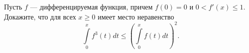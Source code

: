 \documentclass{article}
\begin{document}
Пусть $f$ --- дифференцируемая функция, причем $f(0)=0$ и $0 < f'(x) \leqslant 1$. Докажите, что для всех $x \geqslant 0$ имеет место неравенство
$$\int\limits_0^x f^3 (t) dt \leqslant \left( \int\limits_0^x f(t) dt \right)^2.$$
\end{document}
